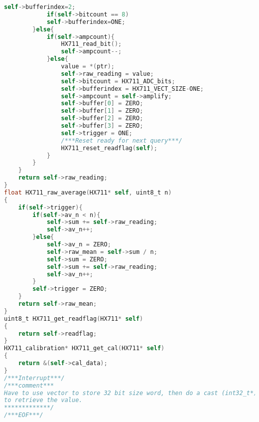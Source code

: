 \begin{lstlisting}[language=C, caption={hx711.c}, label=hx711-c, captionpos=b]
			self->bufferindex=2;
			if(self->bitcount == 8)
			self->bufferindex=ONE;
		}else{
			if(self->ampcount){
				HX711_read_bit();
				self->ampcount--;
			}else{
				value = *(ptr);
				self->raw_reading = value;
				self->bitcount = HX711_ADC_bits;
				self->bufferindex = HX711_VECT_SIZE-ONE;
				self->ampcount = self->amplify;
				self->buffer[0] = ZERO;
				self->buffer[1] = ZERO;
				self->buffer[2] = ZERO;
				self->buffer[3] = ZERO;
				self->trigger = ONE;
				/***Reset ready for next query***/
				HX711_reset_readflag(self);
			}
		}
	}
	return self->raw_reading;
}
float HX711_raw_average(HX711* self, uint8_t n)
{
	if(self->trigger){
		if(self->av_n < n){
			self->sum += self->raw_reading;
			self->av_n++;
		}else{
			self->av_n = ZERO;
			self->raw_mean = self->sum / n;
			self->sum = ZERO;
			self->sum += self->raw_reading;
			self->av_n++;
		}
		self->trigger = ZERO;
	}
	return self->raw_mean;
}
uint8_t HX711_get_readflag(HX711* self)
{
	return self->readflag;
}
HX711_calibration* HX711_get_cal(HX711* self)
{
	return &(self->cal_data);
}
/***Interrupt***/
/***comment***
Have to use vector to store 32 bit size word, then do a cast (int32_t*)
to retrieve the value.
*************/
/***EOF***/
\end{lstlisting}
